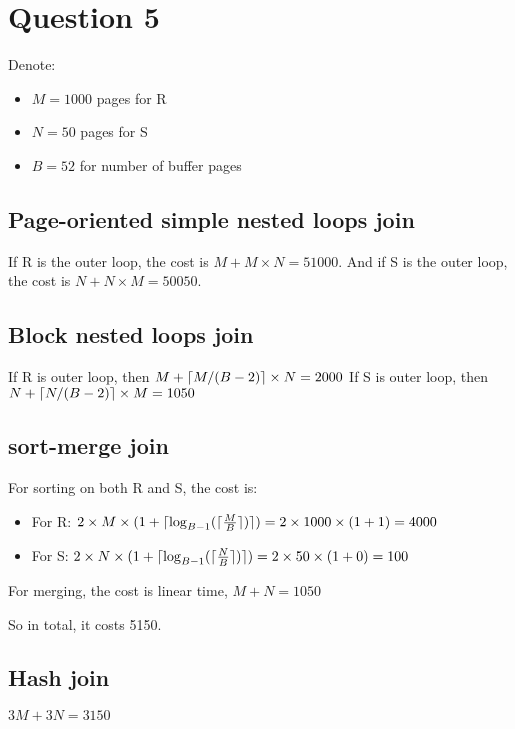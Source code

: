 \section{Question 5}\label{question-5}

Denote:

\begin{itemize}
\tightlist
\item
  $M=1000$ pages for R
\item
  $N=50$ pages for S
\item
  $B=52$ for number of buffer pages
\end{itemize}

\subsection{Page-oriented simple nested loops join}\label{page-oriented-simple-nested-loops-join}

If R is the outer loop, the cost is $M + M \times N = 51000$. 
And if S is the outer loop, the cost is $N + N \times M = 50050$. 

\subsection{Block nested loops join}\label{block-nested-loops-join}

If R is outer loop, then $M + \lceil M / (B-2)\rceil \times N = 2000$
If S is outer loop, then $N + \lceil N / (B-2)\rceil \times M = 1050$

\subsection{sort-merge join}\label{sort-merge-join}

For sorting on both R and S, the cost is:

\begin{itemize}
\tightlist
\item
  For R: $2 \times M \times (1 + \lceil\log_{B-1}(\lceil\frac{M}{B}\rceil)\rceil) = 2 \times 1000 \times (1 + 1) = 4000$
\item
  For S: $2 \times N \times (1 + \lceil\log_{B-1}(\lceil\frac{N}{B}\rceil)\rceil) = 2 \times 50 \times (1 + 0) = 100$
\end{itemize}

For merging, the cost is linear time, $M + N = 1050$

So in total, it costs 5150. 

\subsection{Hash join}\label{hash-join}

$3M+3N = 3150$

